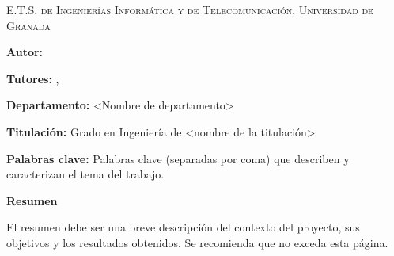 
\pagestyle{fancy}
\renewcommand{\headrulewidth}{0pt}

\begin{center}
	\scshape
	E.T.S. de Ingenierías Informática y de Telecomunicación, Universidad de Granada
\end{center}

\bigskip

\begin{center}
	\Large \scshape
	\textbf{\tfgtitlename}
\end{center}

\bigskip \bigskip \bigskip

\begin{minipage}{\textwidth}

\textbf{Autor:} \tfgauthorname

\medskip

\textbf{Tutores:} \tfgtutornameA , \tfgtutornameB

\medskip


\medskip

\textbf{Departamento:} <Nombre de departamento>

\medskip

\textbf{Titulación:} Grado en Ingeniería de <nombre de la titulación>

\medskip

\textbf{Palabras clave:} Palabras clave (separadas por coma) que describen y caracterizan el tema del trabajo.

\bigskip \bigskip


\end{minipage}

\begin{center}
	\textbf{Resumen}
\end{center}

El resumen debe ser una breve descripción del contexto del proyecto,
sus objetivos y los resultados obtenidos. Se recomienda que no exceda
esta página.


\blankpage
